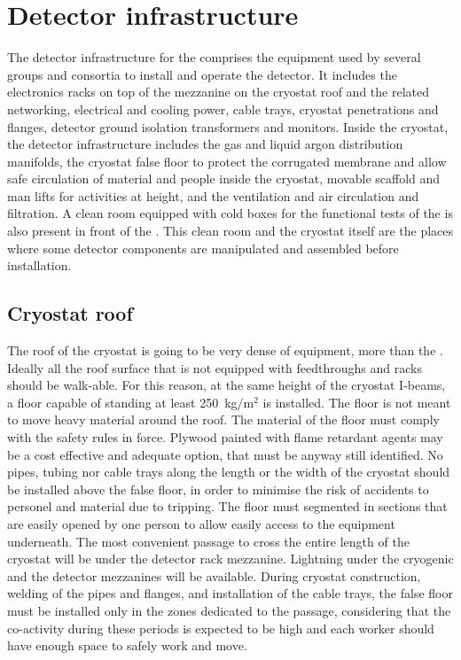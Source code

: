 \section{Detector infrastructure}
\label{ch:dp-tc-infrastructure}

The detector infrastructure for the  comprises the equipment used by several groups and consortia to install and operate the detector.
It includes the electronics racks on top of the mezzanine on the cryostat roof and the related networking, electrical and cooling power, cable trays, cryostat penetrations and flanges, detector ground isolation transformers and monitors.
Inside the cryostat, the detector infrastructure includes the gas and liquid argon distribution manifolds, the cryostat false floor to protect the corrugated membrane and allow safe circulation of material and people inside the cryostat, movable scaffold and man lifts for activities at height, and the ventilation and air circulation and filtration.
A clean room equipped with cold boxes for the functional tests of the  is also present in front of the .
This clean room and the cryostat itself are the places where some detector components are manipulated and assembled before installation.

\subsection{Cryostat roof}
The roof of the  cryostat is going to be very dense of equipment, more than the .
Ideally all the roof surface that is not equipped with feedthroughs and racks should be walk-able.
For this reason, at the same height of the cryostat I-beams, a floor capable of standing at least 250~kg/m$^2$ is installed.
The floor is not meant to move heavy material around the roof.
The material of the floor must comply with the safety rules in force.
Plywood painted with flame retardant agents may be a cost effective and adequate option, that must be anyway still identified.
No pipes, tubing nor cable trays along the length or the width of the cryostat should be installed above the false floor, in order to minimise the risk of accidents to personel and material due to tripping.
The floor must segmented in sections that are easily opened by one person to allow easily access to the equipment underneath.
The most convenient passage to cross the entire length of the cryostat will be under the detector rack mezzanine.
Lightning under the cryogenic and the detector mezzanines will be available.
During cryostat construction, welding of the pipes and flanges, and installation of the cable trays, the false floor must be installed only in the zones dedicated to the passage, considering that the co-activity during these periods is expected to be high and each worker should have enough space to safely work and move.

